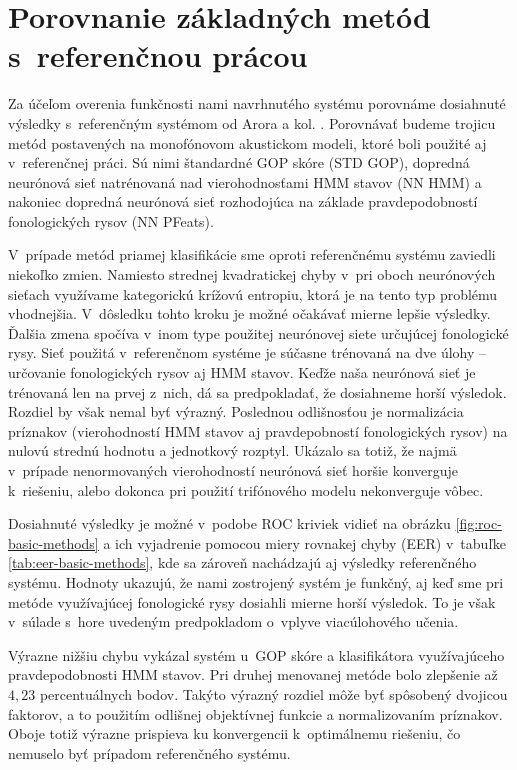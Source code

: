 \section{Porovnanie základných metód s~referenčnou prácou}

Za účeľom overenia funkčnosti nami navrhnutého systému porovnáme dosiahnuté výsledky s~referenčným systémom od Arora a kol. \cite{Arora2017}. Porovnávať budeme trojicu metód postavených na monofónovom akustickom modeli, ktoré boli použité aj v~referenčnej práci. Sú nimi štandardné GOP skóre (STD GOP), dopredná neurónová sieť natrénovaná nad vierohodnosťami HMM stavov (NN HMM) a nakoniec dopredná neurónová sieť rozhodojúca na základe pravdepodobností fonologických rysov (NN PFeats). 

V~prípade metód priamej klasifikácie sme oproti referenčnému systému zaviedli niekoľko zmien. Namiesto strednej kvadratickej chyby v~pri oboch neurónových sieťach využívame kategorickú krížovú entropiu, ktorá je na tento typ problému vhodnejšia. V~dôsledku tohto kroku je možné očakávať mierne lepšie výsledky. Ďalšia zmena spočíva v~inom type použitej neurónovej siete určujúcej fonologické rysy. Sieť použitá v~referenčnom systéme je súčasne trénovaná na dve úlohy -- určovanie fonologických rysov aj HMM stavov. Keďže naša neurónová sieť je trénovaná len na prvej z~nich, dá sa predpokladať, že dosiahneme horší výsledok. Rozdiel by však nemal byť výrazný. Poslednou odlišnosťou je normalizácia príznakov (vierohodností HMM stavov aj pravdepobností fonologických rysov) na nulovú strednú hodnotu a jednotkový rozptyl. Ukázalo sa totiž, že najmä v~prípade nenormovaných vierohodností neurónová sieť horšie konverguje k~riešeniu, alebo dokonca pri použití trifónového modelu nekonverguje vôbec.

Dosiahnuté výsledky je možné v~podobe ROC kriviek vidieť na obrázku \ref{fig:roc-basic-methods} a ich vyjadrenie pomocou miery rovnakej chyby (EER) v~tabuľke \ref{tab:eer-basic-methods}, kde sa zároveň nachádzajú aj výsledky referenčného systému. Hodnoty ukazujú, že nami zostrojený systém je funkčný, aj keď sme pri metóde využívajúcej fonologické rysy dosiahli mierne horší výsledok. To je však v~súlade s~hore uvedeným predpokladom o~vplyve viacúlohového učenia.

Výrazne nižšiu chybu vykázal systém u~GOP skóre a klasifikátora využívajúceho pravdepodobnosti HMM stavov. Pri druhej menovanej metóde bolo zlepšenie až $4{,}23$ percentuálnych bodov. Takýto výrazný rozdiel môže byť spôsobený dvojicou faktorov, a to použitím odlišnej objektívnej funkcie a normalizovaním príznakov. Oboje totiž výrazne prispieva ku konvergencii k~optimálnemu riešeniu, čo nemuselo byť prípadom referenčného systému.

